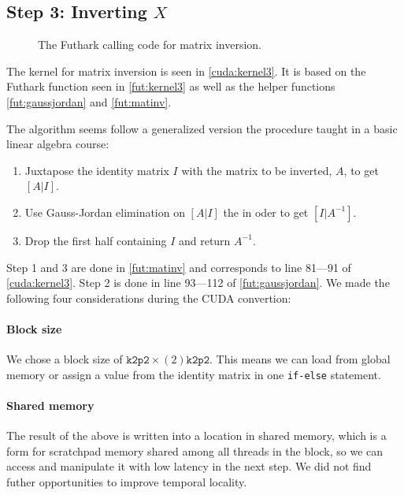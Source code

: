 \subsection{
    Step 3: Inverting \texorpdfstring{\(X\)}{X}
}

\begin{figure}[H]
    \centering
    \caption{The Futhark calling code for matrix inversion.}
    \label{fut:kernel3}
\end{figure}


The kernel for matrix inversion is seen in \autoref{cuda:kernel3}. It is based
on the Futhark function seen in \autoref{fut:kernel3} as well as the helper
functions \autoref{fut:gaussjordan} and \autoref{fut:matinv}.

The algorithm seems follow a generalized version the procedure taught in a basic
linear algebra course:

\begin{enumerate}
    \item Juxtapose the identity matrix \(I\) with the matrix to be inverted,
        \(A\), to get \([A|I]\).
    \item Use Gauss-Jordan elimination on \([A|I]\) the in oder to get
        \([I|A^{-1}]\).
    \item Drop the first half containing \(I\) and return \(A^{-1}\).
\end{enumerate}

Step 1 and 3 are done in \autoref{fut:matinv} and corresponds to line 81---91 of
\autoref{cuda:kernel3}. Step 2 is done in line 93---112 of \autoref{fut:gaussjordan}.  
We made the following four considerations during the CUDA convertion:

\paragraph{Block size}
We chose a block size of \(\texttt{k2p2} \times (2)\texttt{k2p2}\). This means
we can load from global memory or assign a value from the identity matrix in one
\texttt{if-else} statement.

\paragraph{Shared memory}
The result of the above is written into a location in shared memory, which is a
form for scratchpad memory shared among all threads in the block, so we can
access and manipulate it with low latency in the next step. We did not find
futher opportunities to improve temporal locality.

